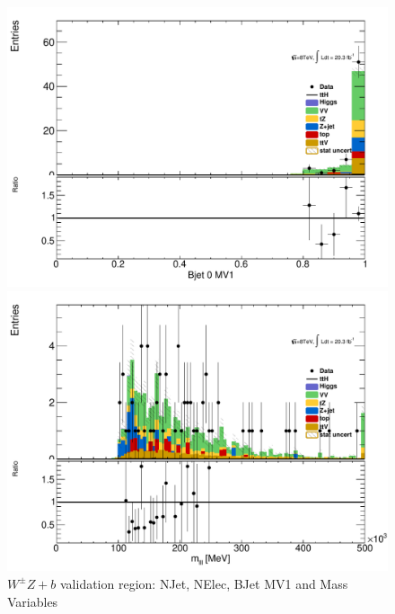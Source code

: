 \begin{figure}[!htbp]
\begin{minipage}[h]{0.5\textwidth}
    \centering \includegraphics[width=\textwidth]{figs/WZ/plotCand_3lep_VVb_BJet0MV1}
  \end{minipage}\hfill
  \begin{minipage}[h]{0.5\textwidth}
    \centering \includegraphics[width=\textwidth]{figs/WZ/plotCand_3lep_VVb_Mlll}
  \end{minipage}\hfill
\caption{$W^{\pm}Z+b$ validation region: NJet, NElec, BJet MV1 and Mass Variables} 
\label{figure:background_wz_z_b}
\end{figure} 

